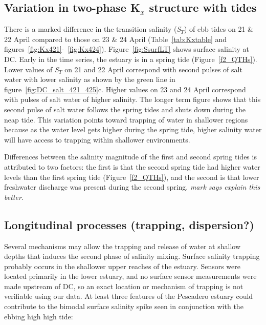 \subsection{Variation in two-phase K$_x$ structure with tides}
There is a marked difference in the transition salinity (\emph{S$_T$}) of ebb tides on 21 \& 22 April compared to those on 23 \& 24 April (Table~\ref{tab:Kxtable} and figures~\ref{fig:Kx421}-~\ref{fig:Kx424}). Figure~\ref{fig:SsurfLT} shows surface salinity at DC. Early in the time series, the estuary is in a spring tide (Figure~\ref{f2_QTHs}). Lower values of \emph{S$_T$} on 21 and 22 April correspond with second pulses of salt water with lower salinity as shown by the green line in figure~\ref{fig:DC_salt_421_425}c. Higher values on 23 and 24 April correspond with pulses of salt water of higher salinity. The longer term figure shows that this second pulse of salt water follows the spring tides and shuts down during the neap tide. This variation points toward trapping of water in shallower regions because as the water level gets higher during the spring tide, higher salinity water will have access to trapping within shallower environments.

Differences between the salinity magnitude of the first and second spring tides is attributed to two factors: the first is that the second spring tide had higher water levels than the first spring tide (Figure~\ref{f2_QTHs}), and the second is that lower freshwater discharge was present during the second spring.  \emph{mark says explain this better}. 

\subsection{Longitudinal processes (trapping, dispersion?)}

Several mechanisms may allow the trapping and release of water at shallow depths that induces the second phase of salinity mixing. Surface salinity trapping probably occurs in the shallower upper reaches of the estuary. Sensors were located primarily in the lower estuary, and no surface sensor measurements were made upstream of DC, so an exact location or mechanism of trapping is not verifiable using our data. At least three features of the Pescadero estuary could contribute to the bimodal surface salinity spike seen in conjunction with the ebbing high high tide:

